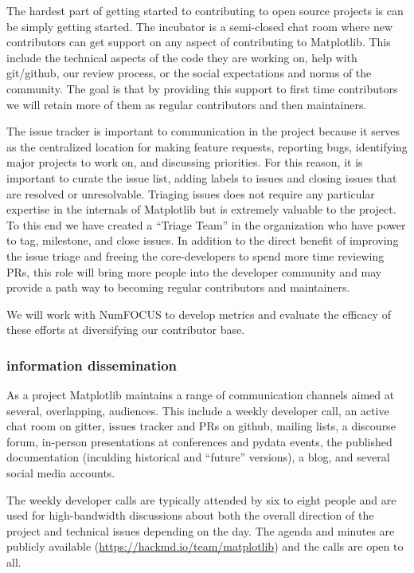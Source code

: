 \documentclass[12pt]{article}
\numberwithin{page}{section}
\begin{document}
The hardest part of getting started to contributing to open source
projects is can be simply getting started.  The incubator is a
semi-closed chat room where new contributors can get support on any
aspect of contributing to Matplotlib.  This include the technical
aspects of the code they are working on, help with git/github, our
review process, or the social expectations and norms of the community.  The
goal is that by providing this support to first time contributors we will
retain more of them as regular contributors and then maintainers.

The issue tracker is important to communication in the project because
it serves as the centralized location for making feature requests,
reporting bugs, identifying major projects to work on, and discussing
priorities.  For this reason, it is important to curate the issue
list, adding labels to issues and closing issues that are resolved or
unresolvable. Triaging issues does not require any particular
expertise in the internals of Matplotlib but is extremely valuable to
the project.  To this end we have created a ``Triage Team'' in the
organization who have power to tag, milestone, and close issues.  In
addition to the direct benefit of improving the issue triage and
freeing the core-developers to spend more time reviewing PRs, this
role will bring more people into the developer community and may
provide a path way to becoming regular contributors and maintainers.


We will work with NumFOCUS to develop metrics and evaluate the efficacy of
these efforts at diversifying our contributor base.

\subsubsection{information dissemination}

As a project Matplotlib maintains a range of communication channels
aimed at several, overlapping, audiences.  This include a weekly
developer call, an active chat room on gitter, issues tracker and PRs
on github, mailing lists, a discourse forum, in-person presentations
at conferences and pydata events, the published documentation
(inculding historical and ``future'' versions), a blog, and several
social media accounts.

The weekly developer calls are typically attended by six to eight
people and are used for high-bandwidth discussions about both the
overall direction of the project and technical issues depending on the
day.  The agenda and minutes are publicly
available (\url{https://hackmd.io/team/matplotlib}) and the
calls are open to all.
\end{document}
